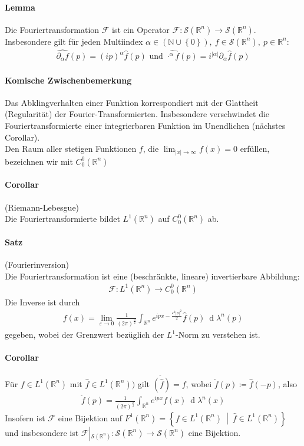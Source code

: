 \documentclass[12pt,a4paper,fleqn]{article}
\def\abs#1{{\left\vert #1 \right\vert}}
\def\set#1{{\left\{ #1 \right\}}}
\def\Mid{\ \middle|\ }
\def\R{{\mathbb{R}}}
\def\d{{\operatorname{d}}}
\begin{document}
\paragraph{Lemma} Die Fouriertransformation $\mathscr{F}$ ist ein Operator $\mathscr{F}\colon \mathscr{S}(\R^n) \rightarrow \mathscr{S}(\R^n)$. Insbesondere gilt für jeden Multiindex $\alpha \in (\mathbb{N} \cup \set{0}),\ f \in \mathscr{S}(\R^n),\ p \in \R^n$:
\begin{align*}
\widehat{\partial_\alpha f}(p) = (ip)^\alpha \widehat{f}(p) \text{ und } \widehat{\cdot^\alpha f}(p) = i^{\abs{\alpha}}\partial_\alpha\widehat{f}(p)
\end{align*}

\paragraph{Komische Zwischenbemerkung} Das Abklingverhalten einer Funktion korrespondiert mit der Glattheit (Regularität) der Fourier-Transformierten. Insbesondere verschwindet die Fouriertransformierte einer integrierbaren Funktion im Unendlichen (nächstes Corollar).\\
Den Raum aller stetigen Funktionen $f$, die $\lim_{\abs{x} \rightarrow \infty} f(x) = 0$ erfüllen, bezeichnen wir mit $C^0_0(\R^n)$

\paragraph{Corollar} (Riemann-Lebesgue)\\
Die Fouriertransformierte bildet $L^1(\R^n)$ auf $C^0_0(\R^n)$ ab.

\paragraph{Satz} (Fourierinversion)\\
Die Fouriertransformation ist eine (beschränkte, lineare) invertierbare Abbildung:
\begin{align*}
\mathscr{F}: L^1(\R^n) \rightarrow C^0_0(\R^n)
\end{align*}
Die Inverse ist durch
\begin{align*}
f(x) = \lim_{\varepsilon\rightarrow 0} \frac{1}{(2\pi)^\frac{n}{2}} \int_{\R^n} e^{ipx-\frac{\varepsilon^2\abs{p}^2}{2}}\widehat{f}(p)\ \d\lambda^n(p)
\end{align*}
gegeben, wobei der Grenzwert bezüglich der $L^1$-Norm zu verstehen ist.

\paragraph{Corollar}  Für $f \in L^1(\R^n)$ mit $\widehat{f} \in L^1(\R^n))$ gilt $\check{(\widehat{f})} = f$, wobei $\check{f}(p) \coloneqq \widehat{f}(-p)$, also 
\begin{align*}
\check{f}(p) = \frac{1}{(2\pi)^{\frac{n}{2}}} \int_{\R^n} e^{ipx}f(x)\ \d\lambda^n(x)
\end{align*}
Insofern ist $\mathscr{F}$ eine Bijektion auf $F^1(\R^n) = \set{f \in L^1(\R^n) \Mid \widehat{f} \in L^1(\R^n)}$ und insbesondere ist $\mathscr{F}\left\vert_{\mathscr{S}(\R^n)}\right. \colon \mathscr{S}(\R^n) \rightarrow \mathscr{S}(\R^n)$ eine Bijektion.
\end{document}
